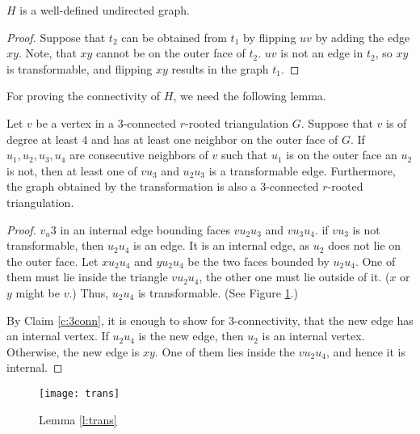 \begin{remark}
  $H$ is a well-defined undirected graph.
\end{remark}
\begin{proof}
  Suppose that $t_2$ can be obtained from $t_1$ by flipping
  $uv$ by adding the edge $xy$. Note, that $xy$ cannot be on the outer face of $t_2$.
  $uv$ is not an edge in $t_2$, so $xy$ is transformable, and flipping $xy$ results
  in the graph $t_1$.
\end{proof}

For proving the connectivity of $H$, we need the following lemma.

\begin{lemma} \label{l:trans}
  Let $v$ be a vertex in a $3$-connected $r$-rooted triangulation $G$. Suppose that $v$ is of degree
  at least $4$ and has at least one neighbor on the outer face of $G$. If $u_1, u_2, u_3, u_4$
  are consecutive neighbors of $v$ such that $u_1$ is on the outer face an $u_2$
  is not, then at least one of $vu_3$ and $u_2u_3$ is a transformable edge. Furthermore,
  the graph obtained by the transformation is also a $3$-connected $r$-rooted triangulation.
\end{lemma}
\begin{proof}
  $v_u3$ in an internal edge bounding faces $vu_2u_3$ and $vu_3u_4$. if $vu_3$
  is not transformable, then $u_2u_4$ is an edge. It is an internal edge, as $u_2$
  does not lie on the outer face. Let $xu_2u_4$ and $yu_2u_4$
  be the two faces bounded by $u_2u_4$. One of them must lie inside the triangle $vu_2u_4$,
  the other one must lie outside of it. ($x$ or $y$ might be $v$.) Thus, $u_2u_4$
  is transformable. (See Figure \ref{fig:trans}.)

  By Claim \ref{c:3conn}, it is enough to show for $3$-connectivity, that the new
  edge has an internal vertex. If $u_2u_4$ is the new edge, then $u_2$ is an internal
  vertex. Otherwise, the new edge is $xy$. One of them lies inside the $vu_2u_4$,
  and hence it is internal.
\end{proof}

\begin{figure}[ht]
  \centering
  \texttt{[image: trans]}
  \caption{Lemma \ref{l:trans}}
  \label{fig:trans}
\end{figure}

